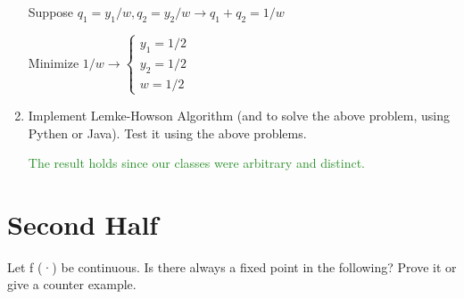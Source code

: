 \documentclass{article}
\newenvironment{answer}{\par\color{ForestGreen}}{\par}
\begin{document}
\begin{enumerate}
\begin{answer}
      Suppose $q_1 = y_1/w, q_2 = y_2 /w \rightarrow q_1 + q_2 = 1/w$

      Minimize $1/w \rightarrow
      \begin{cases}
        y_1 = 1/2 \\
        y_2 = 1/2 \\
        w = 1/2
     \end{cases}
      $

    \end{answer}

    \item
    Implement Lemke-Howson Algorithm (and to solve the above problem, using Pythen or Java). Test it using the above problems.

    \textcolor{ForestGreen}{The result holds since our classes were arbitrary and distinct.}

\end{enumerate}

\section{Second Half}
Let f (·) be continuous. Is there always a fixed point in the following? Prove it or give a counter example.
\end{document}
